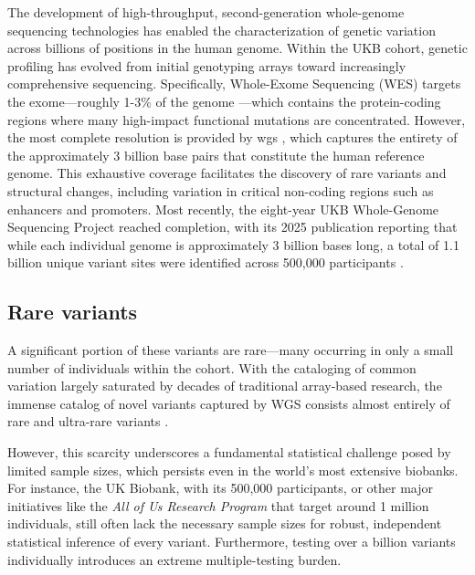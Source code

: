 The development of high-throughput, second-generation whole-genome sequencing technologies has enabled the characterization of genetic variation across billions of positions in the human genome. Within the UKB cohort, genetic profiling has evolved from initial genotyping arrays toward increasingly comprehensive sequencing. Specifically, Whole-Exome Sequencing (WES) \cite{VanHout2020,Szustakowski2021,Backman2021} targets the exome---roughly 1-3\% of the genome \cite{exome_coverage,UkBiobank_WGS2025}---which contains the protein-coding regions where many high-impact functional mutations are concentrated.
However, the most complete resolution is provided by \gls{wgs} \cite{UkBiobank_WGS2025}, which captures the entirety of the approximately 3 billion base pairs that constitute the human reference genome. This exhaustive coverage facilitates the discovery of rare variants and structural changes, including variation in critical non-coding regions such as enhancers and promoters. Most recently, the eight-year UKB Whole-Genome Sequencing Project reached completion, with its 2025 publication reporting that while each individual genome is approximately 3 billion bases long, a total of 1.1 billion unique variant sites were identified across 500,000 participants \cite{UkBiobank_WGS2025}.

\subsection{Rare variants}

A significant portion of these variants are rare---many occurring in only a small number of individuals within the cohort. With the cataloging of common variation largely saturated by decades of traditional array-based research, the immense catalog of novel variants captured by WGS consists almost entirely of rare and ultra-rare variants \cite{UkBiobank_WGS2025}.

However, this scarcity underscores a fundamental statistical challenge posed by limited sample sizes, which persists even in the world's most extensive biobanks. For instance, the UK Biobank, with its 500,000 participants, or other major initiatives like the \textit{All of Us Research Program} \cite{allofus} that target around 1 million individuals, still often lack the necessary sample sizes for robust, independent statistical inference of every variant. Furthermore, testing over a billion variants individually introduces an extreme multiple-testing burden. 

